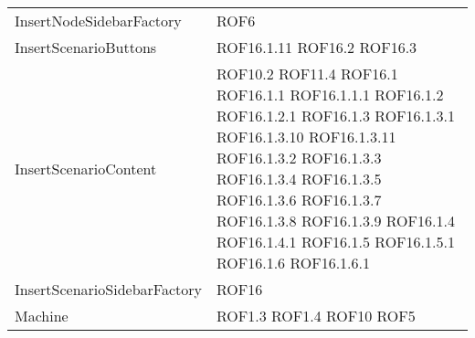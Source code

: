 \begin{longtable}{p{5cm}!{\VRule[1pt]}p{2.5cm}}
		InsertNodeSidebarFactory & ROF6\\
		InsertScenarioButtons & ROF16.1.11 \newline ROF16.2 \newline ROF16.3\\
		InsertScenarioContent & ROF10.2 \newline ROF11.4 \newline ROF16.1 \newline ROF16.1.1 \newline ROF16.1.1.1 \newline ROF16.1.2 \newline ROF16.1.2.1 \newline ROF16.1.3 \newline ROF16.1.3.1 \newline ROF16.1.3.10 \newline ROF16.1.3.11 \newline ROF16.1.3.2 \newline ROF16.1.3.3 \newline ROF16.1.3.4 \newline ROF16.1.3.5 \newline ROF16.1.3.6 \newline ROF16.1.3.7 \newline ROF16.1.3.8 \newline ROF16.1.3.9 \newline ROF16.1.4 \newline ROF16.1.4.1 \newline ROF16.1.5 \newline ROF16.1.5.1 \newline ROF16.1.6 \newline ROF16.1.6.1\\
		InsertScenarioSidebarFactory & ROF16\\
		Machine & ROF1.3 \newline ROF1.4 \newline ROF10 \newline ROF5\\

\end{longtable}
